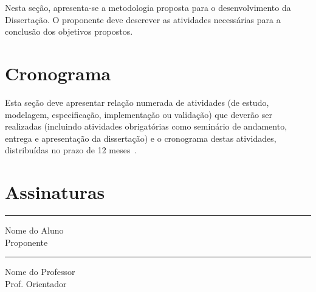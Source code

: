 \documentclass[diss-proposta,nocipinfo]{texufpel}
\begin{document}
Nesta seção, apresenta-se a metodologia proposta para o
desenvolvimento da Dissertação. O proponente deve descrever as
atividades necessárias para a conclusão dos objetivos propostos. 

\chapter{Cronograma}

Esta seção deve apresentar relação numerada de atividades (de estudo,
modelagem, especificação, implementação ou validação) que deverão ser
realizadas (incluindo atividades obrigatórias como seminário de
andamento, entrega e apresentação da dissertação) e o cronograma
destas atividades, distribuídas no prazo de 12
meses~\cite{vonNeumann:1966:TSR}.




\chapter{Assinaturas}
\vspace{2cm}

\begin{center}
\rule{8cm}{.3mm}
\medskip

	Nome do Aluno\\
	Proponente

\end{center}

\vspace{4cm}

\begin{center}
\rule{8cm}{.3mm}
\medskip

	Nome do Professor\\
	Prof. Orientador

\end{center}
\end{document}
